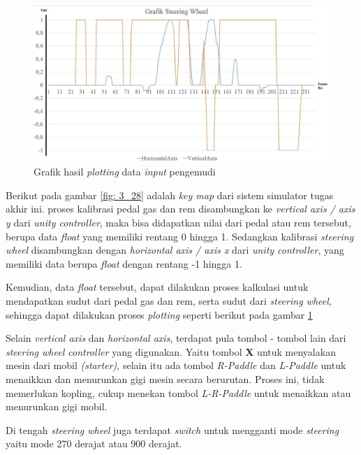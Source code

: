 	\begin{figure}  [!htb]
	    \captionsetup{justification=centering}
	    \includegraphics[scale=0.3]{img/driverinput.JPG}
	    \caption{Grafik hasil \textit{plotting} data \textit{input} pengemudi}
	    \label{fig: 3_29}
    \end{figure}
    
    Berikut pada gambar \ref{fig: 3_28} adalah \textit{key map} dari sistem simulator tugas akhir ini. proses kalibrasi pedal gas dan rem disambungkan ke \textit{vertical axis / axis y} dari \textit{unity controller}, maka bisa didapatkan nilai dari pedal atau rem tersebut, berupa data \textit{float} yang memiliki rentang 0 hingga 1. Sedangkan kalibrasi \textit{steering wheel} disambungkan dengan \textit{horizontal axis / axis x} dari \textit{unity controller}, yang memiliki data berupa \textit{float} dengan rentang -1 hingga 1.
    \par Kemudian, data \textit{float} tersebut, dapat dilakukan proses kalkulasi untuk mendapatkan sudut dari pedal gas dan rem, serta sudut dari \textit{steering wheel}, sehingga dapat dilakukan proses \textit{plotting} seperti berikut pada gambar \ref{fig: 3_29}
    
    Selain \textit{vertical axis} dan \textit{horizontal axis}, terdapat pula tombol - tombol lain dari \textit{steering wheel controller} yang digunakan. Yaitu tombol \textbf{X} untuk menyalakan mesin dari mobil \textit{(starter)}, selain itu ada tombol \textit{R-Paddle} dan \textit{L-Paddle} untuk menaikkan dan menurunkan gigi mesin secara berurutan. Proses ini, tidak memerlukan kopling, cukup menekan tombol \textit{L-R-Paddle} untuk menaikkan atau menurunkan gigi mobil.
    
    \par Di tengah \textit{steering wheel} juga terdapat \textit{switch} untuk mengganti mode \textit{steering} yaitu mode 270 derajat atau 900 derajat.
